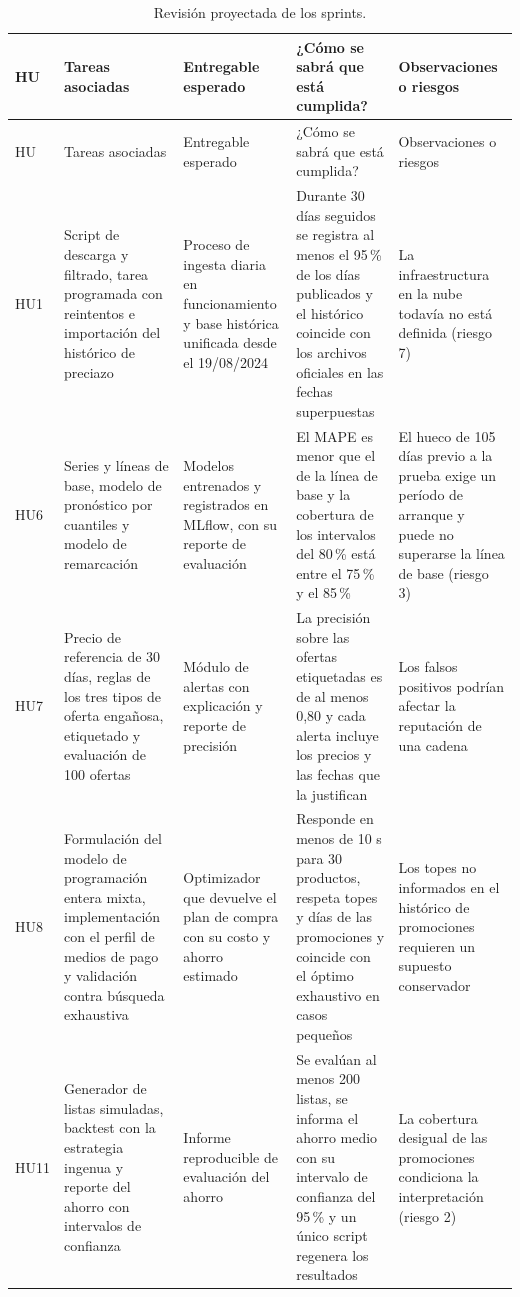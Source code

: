 \documentclass[
11pt, %
]{charter}
\begin{document}
{\small
\begin{longtable}{@{}|>{\raggedright\arraybackslash}p{1.1cm}|>{\raggedright\arraybackslash}p{3.1cm}|>{\raggedright\arraybackslash}p{2.9cm}|>{\raggedright\arraybackslash}p{3.5cm}|>{\raggedright\arraybackslash}p{2.9cm}|@{}}
\caption{Revisión proyectada de los sprints.}
\label{tab:review}\\
\hline
\rowcolor[HTML]{C0C0C0}
HU & Tareas asociadas & Entregable esperado & ¿Cómo se sabrá que está cumplida? & Observaciones o riesgos \\ \hline
\endfirsthead
\hline
\rowcolor[HTML]{C0C0C0}
HU & Tareas asociadas & Entregable esperado & ¿Cómo se sabrá que está cumplida? & Observaciones o riesgos \\ \hline
\endhead
HU1 & Script de descarga y filtrado, tarea programada con reintentos e importación del histórico de preciazo & Proceso de ingesta diaria en funcionamiento y base histórica unificada desde el 19/08/2024 & Durante 30 días seguidos se registra al menos el 95\,\% de los días publicados y el histórico coincide con los archivos oficiales en las fechas superpuestas & La infraestructura en la nube todavía no está definida (riesgo 7) \\ \hline
HU6 & Series y líneas de base, modelo de pronóstico por cuantiles y modelo de remarcación & Modelos entrenados y registrados en MLflow, con su reporte de evaluación & El MAPE es menor que el de la línea de base y la cobertura de los intervalos del 80\,\% está entre el 75\,\% y el 85\,\% & El hueco de 105 días previo a la prueba exige un período de arranque y puede no superarse la línea de base (riesgo 3) \\ \hline
HU7 & Precio de referencia de 30 días, reglas de los tres tipos de oferta engañosa, etiquetado y evaluación de 100 ofertas & Módulo de alertas con explicación y reporte de precisión & La precisión sobre las ofertas etiquetadas es de al menos 0,80 y cada alerta incluye los precios y las fechas que la justifican & Los falsos positivos podrían afectar la reputación de una cadena \\ \hline
HU8 & Formulación del modelo de programación entera mixta, implementación con el perfil de medios de pago y validación contra búsqueda exhaustiva & Optimizador que devuelve el plan de compra con su costo y ahorro estimado & Responde en menos de 10 s para 30 productos, respeta topes y días de las promociones y coincide con el óptimo exhaustivo en casos pequeños & Los topes no informados en el histórico de promociones requieren un supuesto conservador \\ \hline
HU11 & Generador de listas simuladas, backtest con la estrategia ingenua y reporte del ahorro con intervalos de confianza & Informe reproducible de evaluación del ahorro & Se evalúan al menos 200 listas, se informa el ahorro medio con su intervalo de confianza del 95\,\% y un único script regenera los resultados & La cobertura desigual de las promociones condiciona la interpretación (riesgo 2) \\ \hline
\end{longtable}
}
\end{document}
